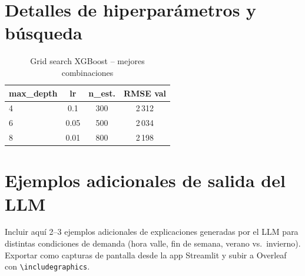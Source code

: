 \documentclass[10pt,twocolumn]{article}
\begin{document}
\section{Detalles de hiperparámetros y búsqueda}

\begin{table}[H]
\centering
\caption{Grid search XGBoost -- mejores combinaciones}
\label{tab:grid}
\begin{tabular}{lccc}
\toprule
\textbf{max\_depth} & \textbf{lr} & \textbf{n\_est.} & \textbf{RMSE val} \\
\midrule
4 & 0.1  & 300 & 2\,312 \\
6 & 0.05 & 500 & 2\,034 \\
8 & 0.01 & 800 & 2\,198 \\
\bottomrule
\end{tabular}
\end{table}

\section{Ejemplos adicionales de salida del LLM}

Incluir aquí 2--3 ejemplos adicionales de explicaciones
generadas por el LLM para distintas condiciones de demanda
(hora valle, fin de semana, verano vs.\ invierno).
Exportar como capturas de pantalla desde la app Streamlit
y subir a Overleaf con \texttt{\textbackslash includegraphics}.
\end{document}
